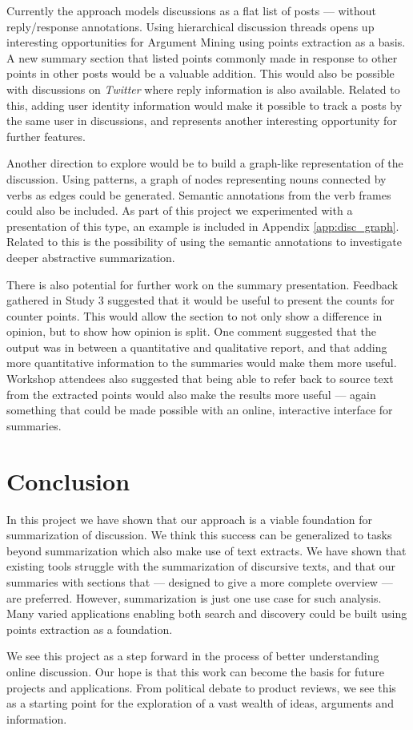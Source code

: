     Currently the approach models discussions as a flat list of posts --- without reply/response annotations. Using hierarchical discussion threads opens up interesting opportunities for Argument Mining using points extraction as a basis. A new summary section that listed points commonly made in response to other points in other posts would be a valuable addition. This would also be possible with discussions on \textit{Twitter} where reply information is also available. Related to this, adding user identity information would make it possible to track a posts by the same user in discussions, and represents another interesting opportunity for further features.

    Another direction to explore would be to build a graph-like representation of the discussion. Using patterns, a graph of nodes representing nouns connected by verbs as edges could be generated. Semantic annotations from the verb frames could also be included. As part of this project we experimented with a presentation of this type, an example is included in Appendix \ref{app:disc_graph}. Related to this is the possibility of using the semantic annotations to investigate deeper abstractive summarization.

    There is also potential for further work on the summary presentation. Feedback gathered in Study 3 suggested that it would be useful to present the counts for counter points. This would allow the section to not only show a difference in opinion, but to show how opinion is split. One comment suggested that the output was in between a quantitative and qualitative report, and that adding more quantitative information to the summaries would make them more useful. Workshop attendees also suggested that being able to refer back to source text from the extracted points would also make the results more useful --- again something that could be made possible with an online, interactive interface for summaries.

  \section{Conclusion}
    In this project we have shown that our approach is a viable foundation for summarization of discussion. We think this success can be generalized to tasks beyond summarization which also make use of text extracts. We have shown that existing tools struggle with the summarization of discursive texts, and that our summaries with sections that --- designed to give a more complete overview --- are preferred. However, summarization is just one use case for such analysis. Many varied applications enabling both search and discovery could be built using points extraction as a foundation.

    We see this project as a step forward in the process of better understanding online discussion. Our hope is that this work can become the basis for future projects and applications. From political debate to product reviews, we see this as a starting point for the exploration of a vast wealth of ideas, arguments and information.

